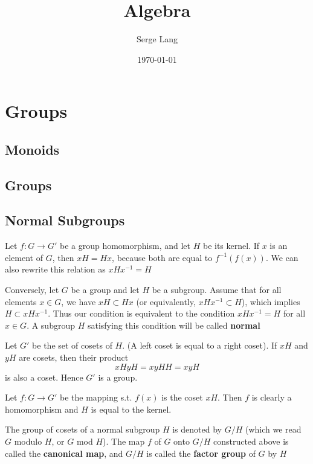 \documentclass[11pt]{article}
\author{Serge Lang}
\date{\today}
\title{Algebra}
\begin{document}
\maketitle
\tableofcontents

\section{Groups}
\label{sec:org189c23d}
\subsection{Monoids}
\label{sec:org5ff5aea}
\subsection{Groups}
\label{sec:orgd8d508f}
\subsection{Normal Subgroups}
\label{sec:orgd47e9fd}
Let \(f:G\to G'\) be a group homomorphism, and let \(H\) be its kernel. If \(x\) is an element
of \(G\), then \(xH=Hx\), because both are equal to \(f^{-1}(f(x))\). We can also rewrite this
relation as \(xHx^{-1}=H\)

Conversely, let \(G\) be a group and let \(H\) be a subgroup. Assume that for all
elements \(x\in G\), we have \(xH\subset Hx\) (or equivalently, \(xHx^{-1}\subset H\)), which
implies \(H\subset xHx^{-1}\). Thus our condition is equivalent to the condition \(xHx^{-1}=H\) for
all \(x\in G\). A subgroup \(H\) satisfying this condition will be called \textbf{normal}

Let \(G'\) be the set of cosets of \(H\). (A left coset is equal to a right coset). If \(xH\)
and \(yH\) are cosets, then their product
\begin{equation*}
xHyH=xyHH=xyH
\end{equation*}
is also a coset. Hence \(G'\) is a group.

Let \(f:G\to G'\) be the mapping s.t. \(f(x)\) is the coset \(xH\). Then \(f\) is clearly a
homomorphism and \(H\) is equal to the kernel.

The group of cosets of a normal subgroup \(H\) is denoted by \(G/H\) (which we read \(G\)
modulo \(H\), or \(G\) mod \(H\)). The map \(f\) of \(G\) onto \(G/H\) constructed above is
called the \textbf{canonical map}, and \(G/H\) is called the \textbf{factor group} of \(G\) by \(H\)
\end{document}
